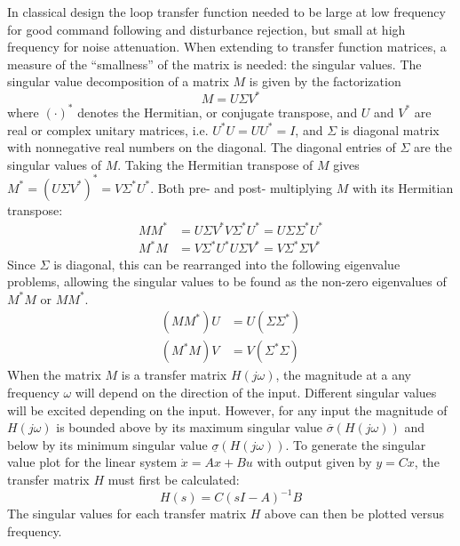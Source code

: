 In classical design the loop transfer function needed to be large at low frequency for good command following and disturbance rejection, but small at high frequency for noise attenuation.
When extending to transfer function matrices, a measure of the ``smallness'' of the matrix is needed: the singular values.
The singular value decomposition of a matrix $M$ is given by the factorization
\begin{equation}
  M=U\Sigma V^{*}
\end{equation}
where $(\cdot)^{*}$ denotes the Hermitian, or conjugate transpose, and $U$ and $V^{*}$ are real or complex unitary matrices, i.e. $U^{*}U=UU^{*}=I$, and $\Sigma$ is diagonal matrix with nonnegative real numbers on the diagonal.
The diagonal entries of $\Sigma$ are the singular values of $M$.
Taking the Hermitian transpose of $M$ gives $M^{*}=(U\Sigma V^{*})^{*}=V\Sigma^{*}U^{*}$.
Both pre- and post- multiplying $M$ with its Hermitian transpose:
\begin{equation}
  \begin{split}
    MM^{*}&=U\Sigma V^{*}V\Sigma^{*}U^{*}=U\Sigma \Sigma^{*}U^{*} \\
    M^{*}M&=V\Sigma^{*}U^{*}U\Sigma V^{*}=V\Sigma^{*}\Sigma V^{*}
  \end{split}
\end{equation}
Since $\Sigma$ is diagonal, this can be rearranged into the following eigenvalue problems, allowing the singular values to be found as the non-zero eigenvalues of $M^{*}M$ or $MM^{*}$.
\begin{equation}
  \begin{split}
    (MM^{*})U&=U(\Sigma \Sigma^{*}) \\
    (M^{*}M)V&=V(\Sigma^{*}\Sigma)
  \end{split}
\end{equation}
When the matrix $M$ is a transfer matrix $H(j\omega)$, the magnitude at a any frequency $\omega$ will depend on the direction of the input.
Different singular values will be excited depending on the input.
However, for any input the magnitude of $H(j\omega)$ is bounded above by its maximum singular value $\overline{\sigma}(H(j\omega))$ and below by its minimum singular value $\underline{\sigma}(H(j\omega))$.
To generate the singular value plot for the linear system $\dot{x}=Ax+Bu$ with output given by $y=Cx$, the transfer matrix $H$ must first be calculated:
\begin{equation}
  H(s)=C(sI-A)^{-1}B
\end{equation}
The singular values for each transfer matrix $H$ above can then be plotted versus frequency.
